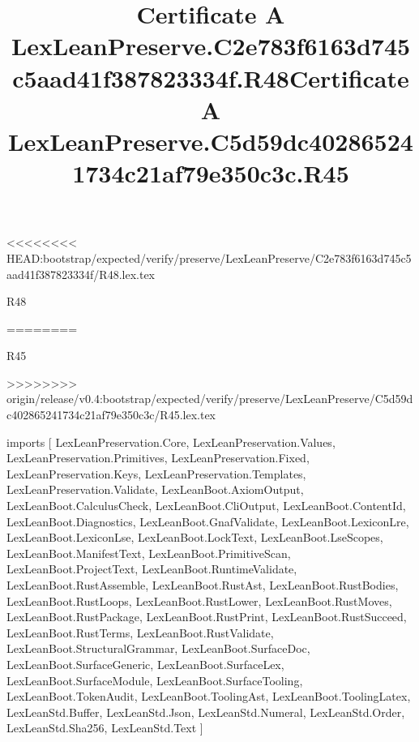 <<<<<<<< HEAD:bootstrap/expected/verify/preserve/LexLeanPreserve/C2e783f6163d745c5aad41f387823334f/R48.lex.tex
\begin{lexlean}{R48}
\title{Certificate A LexLeanPreserve.C2e783f6163d745c5aad41f387823334f.R48}
========
\begin{lexlean}{R45}
\title{Certificate A LexLeanPreserve.C5d59dc402865241734c21af79e350c3c.R45}
>>>>>>>> origin/release/v0.4:bootstrap/expected/verify/preserve/LexLeanPreserve/C5d59dc402865241734c21af79e350c3c/R45.lex.tex
\begin{coremodule}
imports [
  LexLeanPreservation.Core,
  LexLeanPreservation.Values,
  LexLeanPreservation.Primitives,
  LexLeanPreservation.Fixed,
  LexLeanPreservation.Keys,
  LexLeanPreservation.Templates,
  LexLeanPreservation.Validate,
  LexLeanBoot.AxiomOutput,
  LexLeanBoot.CalculusCheck,
  LexLeanBoot.CliOutput,
  LexLeanBoot.ContentId,
  LexLeanBoot.Diagnostics,
  LexLeanBoot.GnafValidate,
  LexLeanBoot.LexiconLre,
  LexLeanBoot.LexiconLse,
  LexLeanBoot.LockText,
  LexLeanBoot.LseScopes,
  LexLeanBoot.ManifestText,
  LexLeanBoot.PrimitiveScan,
  LexLeanBoot.ProjectText,
  LexLeanBoot.RuntimeValidate,
  LexLeanBoot.RustAssemble,
  LexLeanBoot.RustAst,
  LexLeanBoot.RustBodies,
  LexLeanBoot.RustLoops,
  LexLeanBoot.RustLower,
  LexLeanBoot.RustMoves,
  LexLeanBoot.RustPackage,
  LexLeanBoot.RustPrint,
  LexLeanBoot.RustSucceed,
  LexLeanBoot.RustTerms,
  LexLeanBoot.RustValidate,
  LexLeanBoot.StructuralGrammar,
  LexLeanBoot.SurfaceDoc,
  LexLeanBoot.SurfaceGeneric,
  LexLeanBoot.SurfaceLex,
  LexLeanBoot.SurfaceModule,
  LexLeanBoot.SurfaceTooling,
  LexLeanBoot.TokenAudit,
  LexLeanBoot.ToolingAst,
  LexLeanBoot.ToolingLatex,
  LexLeanStd.Buffer,
  LexLeanStd.Json,
  LexLeanStd.Numeral,
  LexLeanStd.Order,
  LexLeanStd.Sha256,
  LexLeanStd.Text
]


\end{coremodule}
\end{lexlean}
\end{lexlean}
